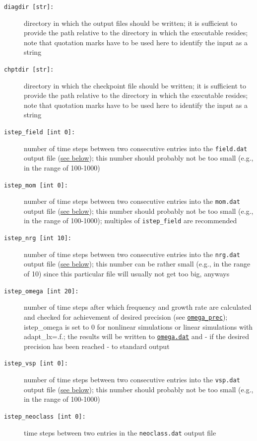 \documentclass[12pt]{article}
\begin{document}
\begin{description}

\item[\texttt{diagdir [str]:}] directory in which the output files should be written; it is sufficient
to provide the path relative to the directory in which the executable resides; note that quotation marks
have to be used here to identify the input as a string
\item[\texttt{chptdir [str]:}] directory in which the checkpoint file should be written; it is sufficient
to provide the path relative to the directory in which the executable resides; note that quotation marks
have to be used here to identify the input as a string
\item[\hypertarget{istep_field}{\tt istep\_field [int 0]:}] number of time steps between two consecutive
entries into the \texttt{field.dat} output file (\hyperref[subsec:field-file]{see below});
this number should probably not be too small (e.g., in the range of 100-1000)
\item[\hypertarget{istep_mom}{\tt istep\_mom [int 0]:}] number of time steps between two consecutive
entries into the \texttt{mom.dat} output file (\hyperref[subsec:mom-file]{see below});
this number should probably not be too small (e.g., in the
range of 100-1000); multiples of \texttt{istep\_field} are recommended
\item[\hypertarget{istep_nrg}{\tt istep\_nrg [int 10]:}] number of time steps between two consecutive
entries into the \texttt{nrg.dat} output file (\hyperref[subsec:nrg-file]{see below});
this number can be rather small (e.g., in the range of 10) since this particular file will usually
not get too big, anyways
\item[\hypertarget{istep_omega}{\tt istep\_omega [int 20]:}] number of time
steps after which frequency and growth rate are calculated and checked for achievement of desired precision
(see \hyperlink{omega_prec}{\tt omega\_prec}); istep\_omega is set to 0 for nonlinear simulations or linear simulations with
adapt\_lx=.f.; the results will be written to \hyperref[subsec:omega-file]{\tt omega.dat} and - if
the desired precision has been reached - to standard output
\item[\hypertarget{istep_vsp}{\tt istep\_vsp [int 0]:}] number of time steps between two consecutive
entries into the \texttt{vsp.dat} output file (\hyperref[subsec:vsp-file]{see below});
this number should probably not be too small (e.g., in the range of 100-1000)
\item[\hypertarget{istep_neoclass}{\tt istep\_neoclass [int 0]:}] time steps between two entries in the \texttt{neoclass.dat} output file

\end{description}
\end{document}
